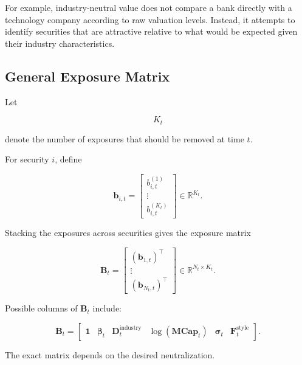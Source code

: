 \documentclass[11pt,a4paper]{article}
\begin{document}
For example, industry-neutral value does not compare a bank directly with a
technology company according to raw valuation levels. Instead, it attempts to
identify securities that are attractive relative to what would be expected
given their industry characteristics.


\subsection{General Exposure Matrix}
\label{subsec:general_exposure_matrix}

Let

\begin{equation}
K_t
\end{equation}

denote the number of exposures that should be removed at time $t$.

For security $i$, define

\begin{equation}
\mathbf{b}_{i,t}
=
\begin{bmatrix}
b_{i,t}^{(1)}
\\
\vdots
\\
b_{i,t}^{(K_t)}
\end{bmatrix}
\in
\mathbb{R}^{K_t}.
\end{equation}

Stacking the exposures across securities gives the exposure matrix

\begin{equation}
\boxed{
\mathbf{B}_t
=
\begin{bmatrix}
(\mathbf{b}_{1,t})^\top
\\
\vdots
\\
(\mathbf{b}_{N_t,t})^\top
\end{bmatrix}
\in
\mathbb{R}^{N_t\times K_t}.
}
\end{equation}

Possible columns of $\mathbf{B}_t$ include:

\begin{equation}
\mathbf{B}_t
=
\begin{bmatrix}
\mathbf{1}
&
\boldsymbol{\beta}_t
&
\mathbf{D}_t^{\mathrm{industry}}
&
\log(\mathbf{MCap}_t)
&
\boldsymbol{\sigma}_t
&
\mathbf{F}_t^{\mathrm{style}}
\end{bmatrix}.
\end{equation}

The exact matrix depends on the desired neutralization.
\end{document}
